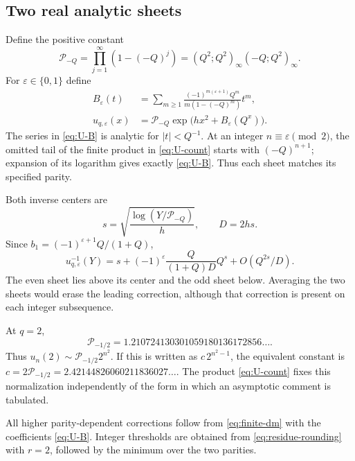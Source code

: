 \documentclass[11pt]{article}
\numberwithin{equation}{section}
\theoremstyle{definition}
\newcommand{\eps}{\varepsilon}
\begin{document}
\subsection{Two real analytic sheets}

Define the positive constant
\begin{equation}\label{eq:Pminus}
 \mathcal P_{-Q}=\prod_{j=1}^{\infty}(1-(-Q)^j)
 =(Q^2;Q^2)_\infty(-Q;Q^2)_\infty.
\end{equation}
For $\eps\in\{0,1\}$ define
\begin{align}
 B_{\eps}(t)&=\sum_{m\ge1}
 \frac{(-1)^{m(\eps+1)}Q^m}{m(1-(-Q)^m)}t^m,
 \label{eq:U-B}\\
 u_{q,\eps}(x)&=\mathcal P_{-Q}
                  \exp\bigl(hx^2+B_{\eps}(Q^x)\bigr).
 \label{eq:U-sheet}
\end{align}
The series in \eqref{eq:U-B} is analytic for $|t|<Q^{-1}$. At an integer $n\equiv\eps\pmod2$, the omitted tail of the finite product in \eqref{eq:U-count} starts with $(-Q)^{n+1}$; expansion of its logarithm gives exactly \eqref{eq:U-B}. Thus each sheet matches its specified parity.

Both inverse centers are
\begin{equation}\label{eq:U-center}
 s=\sqrt{\frac{\log(Y/\mathcal P_{-Q})}h},\qquad D=2hs.
\end{equation}
Since $b_1=(-1)^{\eps+1}Q/(1+Q)$,
\begin{equation}\label{eq:U-first}
 u_{q,\eps}^{-1}(Y)
 =s+(-1)^{\eps}\frac{Q}{(1+Q)D}Q^s+O(Q^{2s}/D).
\end{equation}
The even sheet lies above its center and the odd sheet below. Averaging the two sheets would erase the leading correction, although that correction is present on each integer subsequence.

At $q=2$,
\begin{equation}\label{eq:U-constant-check}
 \mathcal P_{-1/2}=1.210724130301059180136172856\ldots.
\end{equation}
Thus $u_n(2)\sim\mathcal P_{-1/2}2^{n^2}$. If this is written as
$c\,2^{n^2-1}$, the equivalent constant is
$c=2\mathcal P_{-1/2}=2.42144826060211836027\ldots$.
The product \eqref{eq:U-count} fixes this normalization independently of the form in which an asymptotic comment is tabulated.

All higher parity-dependent corrections follow from \eqref{eq:finite-dm} with the coefficients \eqref{eq:U-B}. Integer thresholds are obtained from \eqref{eq:residue-rounding} with $r=2$, followed by the minimum over the two parities.
\end{document}
